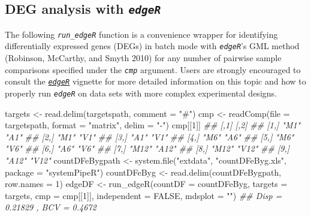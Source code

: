 \documentclass[14pt,]{article}
\newcommand{\hlnum}[1]{\textcolor[rgb]{0.816,0.125,0.439}{#1}}%
\newcommand{\hlstr}[1]{\textcolor[rgb]{0.251,0.627,0.251}{#1}}%
\newcommand{\hlcom}[1]{\textcolor[rgb]{0.502,0.502,0.502}{\textit{#1}}}%
\newcommand{\hlstd}[1]{\textcolor[rgb]{0.251,0.251,0.251}{#1}}%
\newenvironment{Shaded}{\begin{myshaded}}{\end{myshaded}}
\newcommand{\DecValTok}[1]{\hlnum{#1}}
\newcommand{\ConstantTok}[1]{\hlnum{#1}}
\newcommand{\StringTok}[1]{\hlstr{#1}}
\newcommand{\DocumentationTok}[1]{\hlcom{#1}}
\newcommand{\OtherTok}[1]{{#1}}
\newcommand{\FunctionTok}[1]{\hlstd{#1}}
\newcommand{\AttributeTok}[1]{{#1}}
\newcommand{\NormalTok}[1]{\hlstd{#1}}
\begin{document}
\hypertarget{deg-analysis-with-edger}{%
\subsection{\texorpdfstring{DEG analysis with \emph{\texttt{edgeR}}}{DEG analysis with edgeR}}\label{deg-analysis-with-edger}}

The following \emph{\texttt{run\_edgeR}} function is a convenience wrapper for
identifying differentially expressed genes (DEGs) in batch mode with
\emph{\texttt{edgeR}}'s GML method (Robinson, McCarthy, and Smyth 2010) for any number of
pairwise sample comparisons specified under the \emph{\texttt{cmp}} argument. Users
are strongly encouraged to consult the
\href{/href\%7Bhttp://www.bioconductor.org/packages/devel/bioc/vignettes/edgeR/inst/doc/edgeRUsersGuide.pdf}{\emph{\texttt{edgeR}}} vignette
for more detailed information on this topic and how to properly run \emph{\texttt{edgeR}}
on data sets with more complex experimental designs.

\begin{Shaded}
\begin{Highlighting}[]
\NormalTok{targets }\OtherTok{\textless{}{-}} \FunctionTok{read.delim}\NormalTok{(targetspath, }\AttributeTok{comment =} \StringTok{"\#"}\NormalTok{)}
\NormalTok{cmp }\OtherTok{\textless{}{-}} \FunctionTok{readComp}\NormalTok{(}\AttributeTok{file =}\NormalTok{ targetspath, }\AttributeTok{format =} \StringTok{"matrix"}\NormalTok{, }\AttributeTok{delim =} \StringTok{"{-}"}\NormalTok{)}
\NormalTok{cmp[[}\DecValTok{1}\NormalTok{]]}
\DocumentationTok{\#\#       [,1]  [,2] }
\DocumentationTok{\#\#  [1,] "M1"  "A1" }
\DocumentationTok{\#\#  [2,] "M1"  "V1" }
\DocumentationTok{\#\#  [3,] "A1"  "V1" }
\DocumentationTok{\#\#  [4,] "M6"  "A6" }
\DocumentationTok{\#\#  [5,] "M6"  "V6" }
\DocumentationTok{\#\#  [6,] "A6"  "V6" }
\DocumentationTok{\#\#  [7,] "M12" "A12"}
\DocumentationTok{\#\#  [8,] "M12" "V12"}
\DocumentationTok{\#\#  [9,] "A12" "V12"}
\NormalTok{countDFeBygpath }\OtherTok{\textless{}{-}} \FunctionTok{system.file}\NormalTok{(}\StringTok{"extdata"}\NormalTok{, }\StringTok{"countDFeByg.xls"}\NormalTok{, }\AttributeTok{package =} \StringTok{"systemPipeR"}\NormalTok{)}
\NormalTok{countDFeByg }\OtherTok{\textless{}{-}} \FunctionTok{read.delim}\NormalTok{(countDFeBygpath, }\AttributeTok{row.names =} \DecValTok{1}\NormalTok{)}
\NormalTok{edgeDF }\OtherTok{\textless{}{-}} \FunctionTok{run\_edgeR}\NormalTok{(}\AttributeTok{countDF =}\NormalTok{ countDFeByg, }\AttributeTok{targets =}\NormalTok{ targets, }\AttributeTok{cmp =}\NormalTok{ cmp[[}\DecValTok{1}\NormalTok{]], }\AttributeTok{independent =} \ConstantTok{FALSE}\NormalTok{, }
    \AttributeTok{mdsplot =} \StringTok{""}\NormalTok{)}
\DocumentationTok{\#\# Disp = 0.21829 , BCV = 0.4672}
\end{Highlighting}
\end{Shaded}
\end{document}

